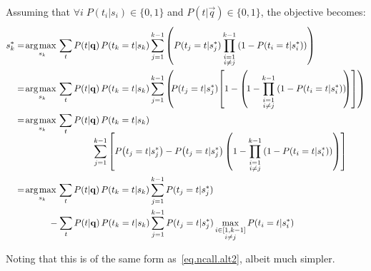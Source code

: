 \noindent
Assuming that $\forall i \; P(t_i|s_i) \in \{0,1\}$ and $P(t|\vec{q}) \in \{0,1\}$, the objective becomes:
\begin{align}
  s_k^* & = \argmax_{s_k} \sum_t P(t|\vec{q}) \, P(t_k = t | s_k) \sum_{j=1}^{k-1} \left( P(t_j=t|s_j^*) \prod_{\substack{i=1 \\ i \neq j}}^{k-1} \left( 1 - P \! \left( t_i=t|s_i^* \right) \right) \right) \nonumber \\
  & = \argmax_{s_k} \sum_t P(t|\vec{q}) \, P(t_k = t | s_k) \sum_{j=1}^{k-1} \left( \!\! P(t_j=t|s_j^*) \! \left[ 1 - \left( \! 1 - \prod_{\substack{i=1 \\ i \neq j}}^{k-1} \left( 1 - P \! \left( t_i=t|s_i^* \right) \right) \!\! \right) \right] \right) \nonumber \\
  & = \argmax_{s_k} \sum_t P(t|\vec{q}) \, P(t_k = t | s_k) \nonumber \\[-2mm]
  & \hspace{30mm} \sum_{j=1}^{k-1} \left[ P \! \left( t_j=t|s_j^* \right) - P \! \left( t_j=t|s_j^* \right) \left( 1 - \prod_{\substack{i=1 \\ i \neq j}}^{k-1} \left( 1 - P \! \left( t_i=t|s_i^* \right) \right) \right) \right] \nonumber \\
  & = \argmax_{s_k} \sum_t P(t|\vec{q}) \, P(t_k = t | s_k) \sum_{j=1}^{k-1} P(t_j=t|s_j^*) \nonumber \\
  & \hspace{13mm} - \sum_t P(t|\vec{q}) \, P(t_k = t | s_k) \sum_{j=1}^{k-1} P(t_j=t|s_j^*) \max_{\substack{ i \in [1, k-1] \\ i \neq j}} P(t_i=t|s_i^*) \nonumber
\end{align}

\noindent
Noting that this is of the same form as~\eqref{eq.ncall.alt2}, albeit much simpler.